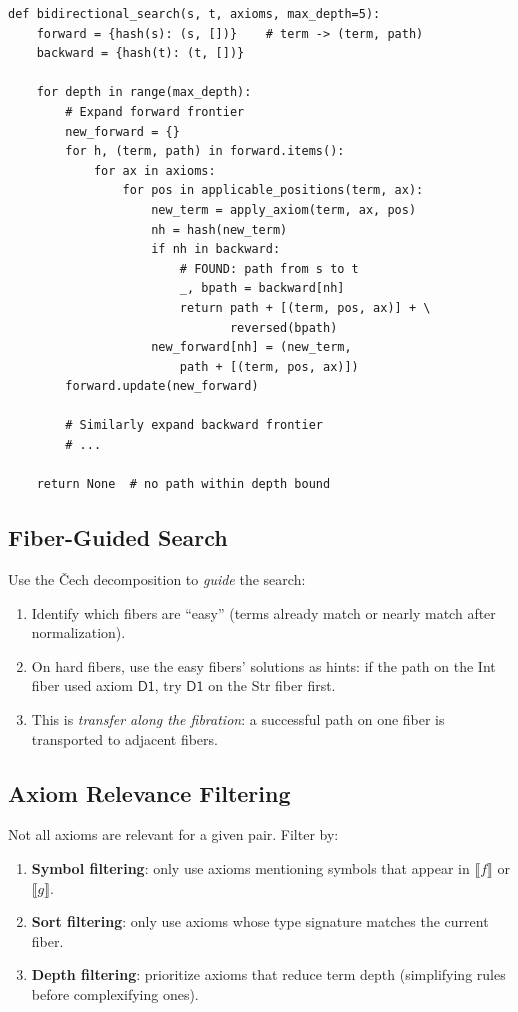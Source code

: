 \documentclass[11pt,a4paper]{report}
\theoremstyle{definition}
\theoremstyle{plain}
\newcommand{\den}[1]{\llbracket #1 \rrbracket}
\begin{document}
\begin{lstlisting}[caption={Bidirectional path search}]
def bidirectional_search(s, t, axioms, max_depth=5):
    forward = {hash(s): (s, [])}    # term -> (term, path)
    backward = {hash(t): (t, [])}

    for depth in range(max_depth):
        # Expand forward frontier
        new_forward = {}
        for h, (term, path) in forward.items():
            for ax in axioms:
                for pos in applicable_positions(term, ax):
                    new_term = apply_axiom(term, ax, pos)
                    nh = hash(new_term)
                    if nh in backward:
                        # FOUND: path from s to t
                        _, bpath = backward[nh]
                        return path + [(term, pos, ax)] + \
                               reversed(bpath)
                    new_forward[nh] = (new_term,
                        path + [(term, pos, ax)])
        forward.update(new_forward)

        # Similarly expand backward frontier
        # ...

    return None  # no path within depth bound
\end{lstlisting}

\subsection{Fiber-Guided Search}

Use the \v{C}ech decomposition to \emph{guide} the search:
\begin{enumerate}
  \item Identify which fibers are ``easy'' (terms already match or
    nearly match after normalization).
  \item On hard fibers, use the easy fibers' solutions as hints:
    if the path on the Int fiber used axiom $\mathsf{D1}$, try
    $\mathsf{D1}$ on the Str fiber first.
  \item This is \emph{transfer along the fibration}: a successful
    path on one fiber is transported to adjacent fibers.
\end{enumerate}

\subsection{Axiom Relevance Filtering}

Not all axioms are relevant for a given pair.  Filter by:
\begin{enumerate}
  \item \textbf{Symbol filtering}: only use axioms mentioning
    symbols that appear in $\den{f}$ or $\den{g}$.
  \item \textbf{Sort filtering}: only use axioms whose type
    signature matches the current fiber.
  \item \textbf{Depth filtering}: prioritize axioms that reduce
    term depth (simplifying rules before complexifying ones).
\end{enumerate}
\end{document}
